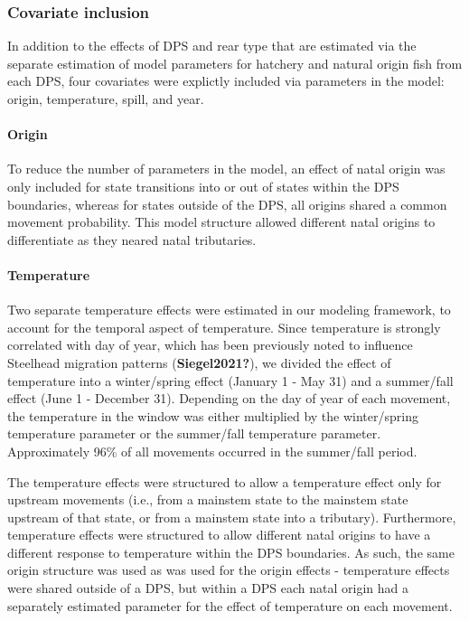 \documentclass[
  12pt,
]{report}
\begin{document}
\hypertarget{covariate-inclusion}{%
\subsubsection{Covariate inclusion}\label{covariate-inclusion}}

In addition to the effects of DPS and rear type that are estimated via
the separate estimation of model parameters for hatchery and natural
origin fish from each DPS, four covariates were explictly included via
parameters in the model: origin, temperature, spill, and year.

\hypertarget{origin}{%
\paragraph{Origin}\label{origin}}

To reduce the number of parameters in the model, an effect of natal
origin was only included for state transitions into or out of states
within the DPS boundaries, whereas for states outside of the DPS, all
origins shared a common movement probability. This model structure
allowed different natal origins to differentiate as they neared natal
tributaries.

\hypertarget{temperature}{%
\paragraph{Temperature}\label{temperature}}

Two separate temperature effects were estimated in our modeling
framework, to account for the temporal aspect of temperature. Since
temperature is strongly correlated with day of year, which has been
previously noted to influence Steelhead migration patterns
(\textbf{Siegel2021?}), we divided the effect of temperature into a
winter/spring effect (January 1 - May 31) and a summer/fall effect (June
1 - December 31). Depending on the day of year of each movement, the
temperature in the window was either multiplied by the winter/spring
temperature parameter or the summer/fall temperature parameter.
Approximately 96\% of all movements occurred in the summer/fall period.

The temperature effects were structured to allow a temperature effect
only for upstream movements (i.e., from a mainstem state to the mainstem
state upstream of that state, or from a mainstem state into a
tributary). Furthermore, temperature effects were structured to allow
different natal origins to have a different response to temperature
within the DPS boundaries. As such, the same origin structure was used
as was used for the origin effects - temperature effects were shared
outside of a DPS, but within a DPS each natal origin had a separately
estimated parameter for the effect of temperature on each movement.
\end{document}
